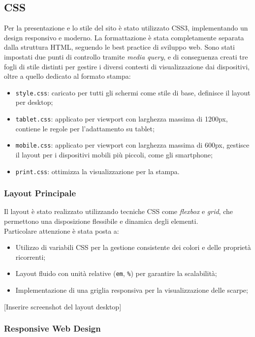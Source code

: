 \documentclass[a4paper, 12pt]{article}
\begin{document}
\begin{justify}
\subsection{CSS}

Per la presentazione e lo stile del sito è stato utilizzato CSS3, implementando un design responsivo e moderno. La formattazione è stata completamente separata dalla struttura HTML, seguendo le best practice di sviluppo web. Sono stati impostati due punti di controllo tramite \textit{media query}, e di conseguenza creati tre fogli di stile distinti per gestire i diversi contesti di visualizzazione dai dispositivi, oltre a quello dedicato al formato stampa:
\begin{itemize}
    \item \texttt{style.css}: caricato per tutti gli schermi come stile di base, definisce il layout per desktop;
    \item \texttt{tablet.css}: applicato per viewport con larghezza massima di 1200px, contiene le regole per l'adattamento su tablet;
    \item \texttt{mobile.css}: applicato per viewport con larghezza massima di 600px, gestisce il layout per i dispositivi mobili più piccoli, come gli smartphone;
    \item \texttt{print.css}: ottimizza la visualizzazione per la stampa.
\end{itemize}

\subsubsection{Layout Principale}

Il layout è stato realizzato utilizzando tecniche CSS come \textit{flexbox} e \textit{grid}, che permettono una disposizione flessibile e dinamica degli elementi.\\ Particolare attenzione è stata posta a:
\begin{itemize}
    \item Utilizzo di variabili CSS per la gestione consistente dei colori e delle proprietà ricorrenti;
    \item Layout fluido con unità relative (\texttt{em}, \texttt{\%}) per garantire la scalabilità;
    \item Implementazione di una griglia responsiva per la visualizzazione delle scarpe;
\end{itemize}
[Inserire screenshot del layout desktop]

\subsubsection{Responsive Web Design}


\end{justify}
\end{document}
